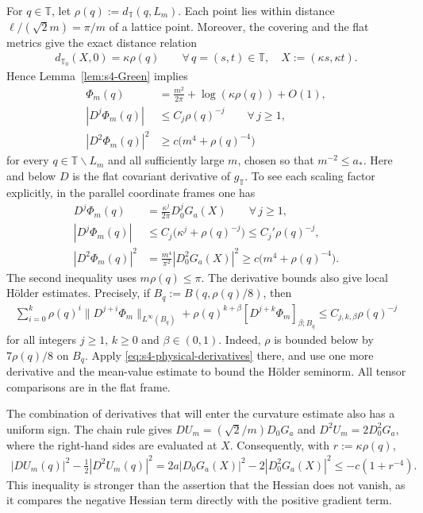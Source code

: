 \documentclass[a4paper,11pt,oneside,reqno]{amsart}
\numberwithin{equation}{section}
\theoremstyle{definition}
\begin{document}
For $q\in\mathbb T$, let
$\rho(q):=d_{\mathbb T}(q,L_m)$. Each point lies within
distance $\ell/(\sqrt2m)=\pi/m$ of a lattice point.
Moreover, the covering and the flat metrics give the exact
distance relation
%
\begin{align*}
    d_{\mathbb T_0}(X,0)=\kappa\rho(q)
    \qquad\forall\,q=(s,t)\in\mathbb T,
    \quad X:=(\kappa s,\kappa t).
\end{align*}
%
Hence Lemma~\ref{lem:s4-Green} implies
%
\begin{align}
    \Phi_m(q)&=\frac{m^2}{2\pi}
        +\log(\kappa\rho(q))+O(1),
        \label{eq:s4-physical-values}\\
    |D^j\Phi_m(q)|&\leq C_j\rho(q)^{-j}
        \qquad\forall\,j\geq1,
        \label{eq:s4-physical-derivatives}\\
    |D^2\Phi_m(q)|^2&\geq c\bigl(m^4+\rho(q)^{-4}\bigr)
        \label{eq:s4-physical-Hessian}
\end{align}
%
for every $q\in\mathbb T\smallsetminus L_m$ and all
sufficiently large $m$, chosen so that $m^{-2}\leq a_*$.
Here and below $D$ is the flat covariant derivative of
$g_{\mathbb T}$. To see each scaling factor explicitly,
in the parallel coordinate frames one has
%
\begin{align*}
    D^j\Phi_m(q)&=\frac{\kappa^j}{2\pi}D_0^jG_a(X)
        \qquad\forall\,j\geq1,\\
    |D^j\Phi_m(q)|
        &\leq C_j\bigl(\kappa^j+\rho(q)^{-j}\bigr)
        \leq C_j'\rho(q)^{-j},\\
    |D^2\Phi_m(q)|^2
        &=\frac{m^4}{\pi^2}|D_0^2G_a(X)|^2
        \geq c\bigl(m^4+\rho(q)^{-4}\bigr).
\end{align*}
%
The second inequality uses $m\rho(q)\leq\pi$.
The derivative bounds also give local H\"older estimates.
Precisely, if $B_q:=B(q,\rho(q)/8)$, then
%
\begin{align*}
    \sum_{i=0}^k\rho(q)^i
        \|D^{j+i}\Phi_m\|_{L^\infty(B_q)}
    +\rho(q)^{k+\beta}[D^{j+k}\Phi_m]_{\beta;B_q}
    \leq C_{j,k,\beta}\rho(q)^{-j}
\end{align*}
%
for all integers $j\geq1$, $k\geq0$ and
$\beta\in(0,1)$. Indeed, $\rho$ is bounded below by
$7\rho(q)/8$ on $B_q$. Apply
\eqref{eq:s4-physical-derivatives} there, and use one more
derivative and the mean-value estimate to bound the H\"older
seminorm. All tensor comparisons are in the flat frame.

The combination of derivatives that will enter the curvature
estimate also has a uniform sign. The chain rule gives
$DU_m=(\sqrt2/m)D_0G_a$ and $D^2U_m=2D_0^2G_a$,
where the right-hand sides are evaluated at $X$.
Consequently, with $r:=\kappa\rho(q)$,
%
\begin{align}
    \label{eq:s4-height-quadratic-margin}
    |DU_m(q)|^2-\tfrac12|D^2U_m(q)|^2
    =2a|D_0G_a(X)|^2-2|D_0^2G_a(X)|^2
    \leq-c(1+r^{-4}).
\end{align}
%
This inequality is stronger than the assertion that the
Hessian does not vanish, as it compares the negative Hessian
term directly with the positive gradient term.
\end{document}
